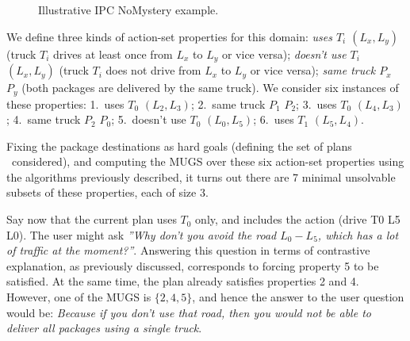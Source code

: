 \begin{wrapfigure}{r}{0.5\columnwidth}
\vspace{-0.4cm} \hspace{-0.4cm} 
\vspace{-0.2cm}
\hspace{-0.6cm} \caption{Illustrative IPC NoMystery example.}
\label{fig:nomystery-example}
\vspace{-0.2cm}
\end{wrapfigure}

We define three kinds of action-set properties for this domain:
\emph{uses $T_i$ $(L_x,L_y)$} (truck $T_i$ drives at least once from
$L_x$ to $L_y$ or vice versa); \emph{doesn't use $T_i$ $(L_x,L_y)$}
(truck $T_i$ does not drive from $L_x$ to $L_y$ or vice versa);
\emph{same truck $P_x$ $P_y$} (both packages are delivered by the same
truck). We consider six instances of these properties: 1.\ uses $T_0$
$(L_2,L_3)$; 2.\ same truck $P_1$ $P_2$; 3.\ uses $T_0$ $(L_4,L_3)$;
4.\ same truck $P_2$ $P_0$; 5.\ doesn't use $T_0$ $(L_0,L_5)$;
6.\ uses $T_1$ $(L_5,L_4)$.

Fixing the package destinations as hard goals (defining the set of
plans \plans\ considered), and computing the MUGS over these six
action-set properties using the algorithms previously described, it
turns out there are 7 minimal unsolvable subsets of these properties,
each of size 3.

Say now that the current plan uses $T_0$ only, and includes the action
(drive T0 L5 L0). The user might ask \emph{''Why don't you avoid the
  road $L_0-L_5$, which has a lot of traffic at the
  moment?''}. Answering this question in terms of contrastive
explanation, as previously discussed, corresponds to forcing property
5 to be satisfied. At the same time, the plan already satisfies
properties 2 and 4. However, one of the MUGS is $\{2,4,5\}$, and hence
the answer to the user question would be: \textit{Because if you don't
  use that road, then you would not be able to deliver all packages
  using a single truck}.

